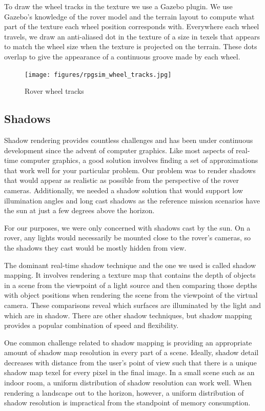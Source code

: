 \documentclass[twocolumn,letterpaper]{IEEEAerospaceCLS}  %
\begin{document}
To draw the wheel tracks in the texture we use a Gazebo plugin.  
We use Gazebo's knowledge of the rover model and the terrain layout to compute what part of the texture each wheel position corresponds with.  
Everywhere each wheel travels, we draw an anti-aliased dot in the texture of a size in texels that appears to match the wheel size when the texture is projected on the terrain.  
These dots overlap to give the appearance of a continuous groove made by each wheel.
\begin{figure}[h!]
  \texttt{[image: figures/rpgsim\_wheel\_tracks.jpg]}
  \caption{Rover wheel tracks}
  \label{fig:wheeltracks}
\end{figure}

\subsection{Shadows}
Shadow rendering provides countless challenges and has been under continuous development since the advent of computer graphics.  
Like most aspects of real-time computer graphics, a good solution involves finding a set of approximations that work well for your particular problem.  
Our problem was to render shadows that would appear as realistic as possible from the perspective of the rover cameras.  
Additionally, we needed a shadow solution that would support low illumination angles and long cast shadows as the reference mission scenarios have the sun at just a few degrees above the horizon.  

For our purposes, we were only concerned with shadows cast by the sun.  
On a rover, any lights would necessarily be mounted close to the rover's cameras, so the shadows they cast would be mostly hidden from view.

The dominant real-time shadow technique and the one we used is called shadow mapping.  
It involves rendering a texture map that contains the depth of objects in a scene from the viewpoint of a light source and then comparing those depths with object positions when rendering the scene from the viewpoint of the virtual camera.
These comparisons reveal which surfaces are illuminated by the light and which are in shadow.  
There are other shadow techniques, but shadow mapping provides a popular combination of speed and flexibility.

One common challenge related to shadow mapping is providing an appropriate amount of shadow map resolution in every part of a scene.  
Ideally, shadow detail decreases with distance from the user's point of view such that there is a unique shadow map texel for every pixel in the final image.  
In a small scene such as an indoor room, a uniform distribution of shadow resolution can work well.
When rendering a landscape out to the horizon, however, a uniform distribution of shadow resolution is impractical from the standpoint of memory consumption.
\end{document}
